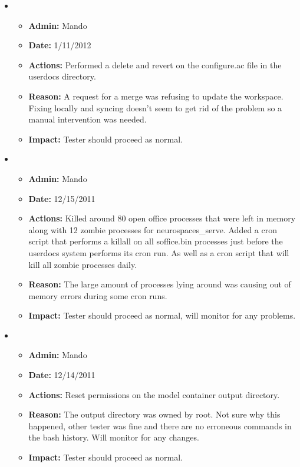 \documentclass[12pt]{article}
\begin{document}
\begin{itemize}
\item
  \begin{itemize}
  \item[] {\bf Admin:} Mando
  \item[] {\bf Date:} 1/11/2012
  \item[] {\bf Actions:} Performed a delete and revert on the configure.ac file in the userdocs directory.
  \item[] {\bf Reason:} A request for a merge was refusing to update the workspace. Fixing locally and syncing doesn't seem to get rid of the problem so a manual intervention was needed. 
  \item[] {\bf Impact:} Tester should proceed as normal.
  \end{itemize}
  
\item
  \begin{itemize}
  \item[] {\bf Admin:} Mando
  \item[] {\bf Date:} 12/15/2011
  \item[] {\bf Actions:} Killed around 80 open office processes that were left in memory along with 12 zombie processes for neurospaces\_serve.  Added a cron script that performs a killall on all soffice.bin processes just before the userdocs system performs its cron run. As well as a cron script that will kill all zombie processes daily.
  \item[] {\bf Reason:} The large amount of processes lying around was causing out of memory errors during some cron runs. 
  \item[] {\bf Impact:} Tester should proceed as normal, will monitor for any problems.
  \end{itemize}
  
\item
  \begin{itemize}
  \item[] {\bf Admin:} Mando
  \item[] {\bf Date:} 12/14/2011
  \item[] {\bf Actions:} Reset permissions on the model container output directory.
  \item[] {\bf Reason:} The output directory was owned by root. Not sure why this happened, other tester was fine and there are no erroneous commands in the bash history. Will monitor for any changes.
  \item[] {\bf Impact:} Tester should proceed as normal.
  \end{itemize}
  

\end{itemize}
\end{document}
